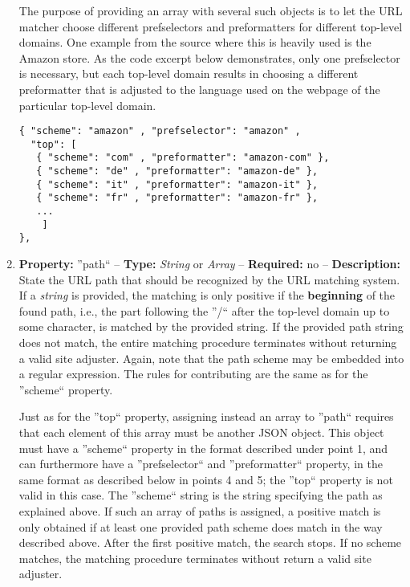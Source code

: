 \documentclass[
a4paper,
12pt,
]
{article}
\begin{document}
\begin{enumerate}
  The purpose of providing an array with several such objects is to let the URL matcher choose different prefselectors and preformatters for different top-level domains. One example from the source where this is heavily used is the Amazon store. As the code excerpt  below demonstrates, only one prefselector is necessary, but each top-level domain results in choosing a different preformatter that is adjusted to the language used on the webpage of the particular top-level domain.
   \begin{center}
\begin{lstlisting}
{ "scheme": "amazon" , "prefselector": "amazon" ,
  "top": [
   { "scheme": "com" , "preformatter": "amazon-com" },
   { "scheme": "de" , "preformatter": "amazon-de" },
   { "scheme": "it" , "preformatter": "amazon-it" },
   { "scheme": "fr" , "preformatter": "amazon-fr" },
   ...
	]
},
\end{lstlisting}
\end{center}

 \item \textbf{Property:} ''path`` -- \textbf{Type:} \textit{String} or \textit{Array} -- \textbf{Required:} no -- \textbf{Description:} State the URL path that should be recognized by the URL matching system. If a \textit{string} is provided, the matching is only positive if the \textbf{beginning} of the found path, i.e., the part following the ''/`` after the top-level domain up to some character, is matched by the provided string. If the provided path string does not match, the entire matching procedure terminates without returning a valid site adjuster.
 Again, note that the path scheme may be embedded into a regular expression. The rules for contributing are the same as for the ''scheme`` property.\par
  
  Just as for the ''top`` property, assigning instead an array to ''path`` requires that each element of this array must be another JSON object. This object must have a ''scheme`` property in the format described under point 1, and can furthermore have a ''prefselector`` and ''preformatter`` property, in the same format as described below in points 4 and 5; the ''top`` property is not valid in this case. 
  The ''scheme`` string is the string specifying the path as explained above. If such an array of paths is assigned, a positive match is only obtained if at least one provided path scheme does match in the way described above. After the first positive match, the search stops. If no scheme matches, the matching procedure terminates without return a valid site adjuster.\par
  

\end{enumerate}
\end{document}
